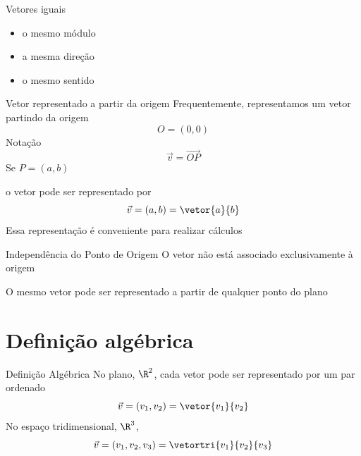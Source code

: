 \documentclass[fleqn,aspectratio=169,12pt]{beamer}
\begin{document}
\begin{frame}{Vetores iguais}
  \begin{itemize}[<+->]
      \item o mesmo módulo
      \item a mesma direção
      \item o mesmo sentido
  \end{itemize}


\end{frame}

\begin{frame}{Vetor representado a partir da origem}
  Frequentemente, representamos um vetor partindo da origem
  \pause
  \[
    O = (0, 0)
  \]
  \pause
  Notação
  \[
    \vec{v} = \overrightarrow{OP}
  \]
  \pause
  Se
  \(
    P = ( a, b )
  \)

  \pause
  o vetor pode ser representado por
  \[
    \vec{v}
    = ( a, b )
    = \vetor{a}{b}
  \]
  \pause
  Essa representação é conveniente para realizar cálculos
\end{frame}

\begin{frame}{Independência do Ponto de Origem}
  O vetor não está associado exclusivamente à origem

  \pause
  O mesmo vetor pode ser representado a partir de qualquer ponto do plano
\end{frame}



\section{Definição algébrica}

\begin{frame}{Definição Algébrica}
  No plano, $\R^2$, cada vetor pode ser representado por um par ordenado
  \[
    \vec{v}
    = ( v_1, v_2 )
    = \vetor{v_1}{v_2}
  \]
  \pause
  No espaço tridimensional, $\R^3$,
  \[
    \vec{v}
    = ( v_1, v_2, v_3 )
    = \vetortri{v_1}{v_2}{v_3}
  \]
\end{frame}
\end{document}
